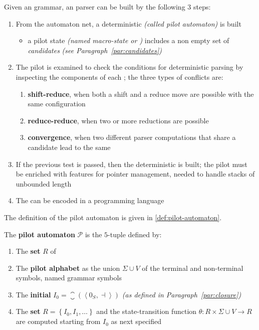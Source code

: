 \documentclass[english]{article}
\begin{document}
Given an \EBNF grammar, an \elro parser can be built by the following \(3\) steps:

\begin{enumerate}
  \item From the automaton net, a deterministic \FSA \textit{(called pilot automaton)} is built
        \begin{itemize}
          \item a pilot state \textit{(named macro-state or \mstate)} includes a non empty set of \textit{candidates} \textit{(see Paragraph~\ref{par:candidates})}
        \end{itemize}
  \item The pilot is examined to check the conditions for deterministic parsing by inspecting the components of each \mstate; the three types of conflicts are:
        \begin{enumerate}[label=\Alph*.]
          \item \textbf{shift-reduce}, when both a shift and a reduce move are possible with the same configuration
          \item \textbf{reduce-reduce}, when two or more reductions are possible
          \item \textbf{convergence}, when two different parser computations that share a candidate lead to the same \mstate
        \end{enumerate}
  \item If the previous test is passed, then the deterministic \PDA is built; the pilot \FSA must be enriched with features for pointer management, needed to handle stacks of unbounded length
  \item The \PDA can be encoded in a programming language
\end{enumerate}

The definition of the pilot automaton is given in \ref{def:pilot-automaton}.

\begin{definition}
  \label{def:pilot-automaton}
  The \textbf{pilot automaton} \(\mathcal{P}\) is the \(5\)-tuple defined by:

  \begin{enumerate}
    \item The \textbf{set} \(R\) of \mstates
    \item The \textbf{pilot alphabet} as the union \(\Sigma \cup V\) of the terminal and non-terminal symbols, named grammar symbols
    \item The \textbf{initial \mstate} \(I_0 = \closure\left( \left\langle 0_S, \dashv \right\rangle \right)\) \textit{(as defined in Paragraph~\ref{par:closure})}
    \item The \textbf{\mstate set} \(R = \left\{ I_0, I_1, \ldots \right\}\) and the state-transition function \(\theta: R \times \Sigma \cup V \rightarrow R\) are computed starting from \(I_0\) as next specified
  \end{enumerate}
\end{definition}
\end{document}
